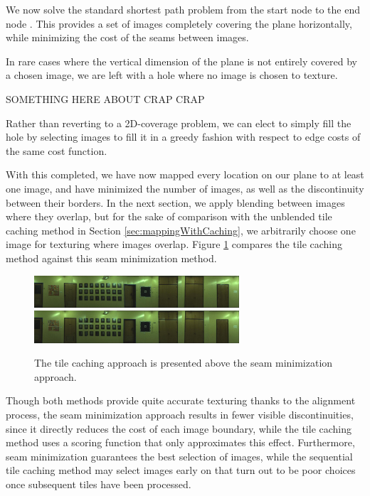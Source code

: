 \message{ !name(paper.tex)}\documentclass[10pt,twocolumn,letterpaper]{article}
\begin{document}
We now solve the standard shortest path problem from the start node to
the end node \cite{shortestPath}. This provides a set of images
completely covering the plane horizontally, while minimizing the cost
of the seams between images.

In rare cases where the vertical dimension of the plane is not
entirely covered by a chosen image, we are left with a hole where no
image is chosen to texture.

SOMETHING HERE ABOUT CRAP CRAP

Rather than reverting to a 2D-coverage problem, we can elect to simply
fill the hole by selecting images to fill it in a greedy fashion with
respect to edge costs of the same cost function.

With this completed, we have now mapped every location on our plane to
at least one image, and have minimized the number of images, as well
as the discontinuity between their borders. In the next section, we
apply blending between images where they overlap, but for the sake of
comparison with the unblended tile caching method in Section
\ref{sec:mappingWithCaching}, we arbitrarily choose one image for
texturing where images overlap. Figure \ref{fig:compare_unblended}
compares the tile caching method against this seam minimization
method.

\begin{figure}
  \centering
  \includegraphics[width=3in]{wall1_cache_full_shifted.jpg}
  \includegraphics[width=3in]{wall1_dynprog_noblend.jpg}
  \caption{The tile caching approach is presented above the seam
    minimization approach.}
  \label{fig:compare_unblended}
\end{figure}


Though both methods provide quite accurate texturing thanks to the
alignment process, the seam minimization approach results in fewer
visible discontinuities, since it directly reduces the cost of each
image boundary, while the tile caching method uses a scoring function
that only approximates this effect. Furthermore, seam minimization
guarantees the best selection of images, while the sequential tile
caching method may select images early on that turn out to be poor
choices once subsequent tiles have been processed.
\end{document}
